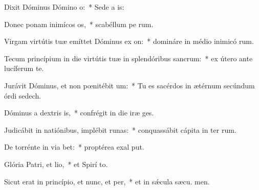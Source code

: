 \item Dixit Dóminus Dómino o:~* Sede a  is:
\item Donec ponam inimícos os,~* scabéllum pe rum.
\item Virgam virtútis tuæ emíttet Dóminus ex on:~* domináre in médio inimicó rum.
\item Tecum princípium in die virtútis tuæ in splendóribus sancrum:~* ex útero ante lucíferum  te.
\item Jurávit Dóminus, et non pœnitébit um:~* Tu es sacérdos in ætérnum secúndum órdi sedech.
\item Dóminus a dextris is,~* confrégit in die iræ  ges.
\item Judicábit in natiónibus, implébit runas:~* conquassábit cápita in ter rum.
\item De torrénte in via bet:~* proptérea exal put.
\item Glória Patri, et lio,~* et Spirí to.
\item Sicut erat in princípio, et nunc, et per,~* et in sǽcula sæcu. men.
